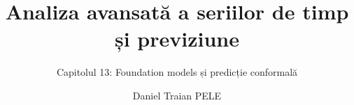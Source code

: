 \title[Analiza avansată a seriilor de timp și previziune]{Analiza avansată a seriilor de timp și previziune}
\subtitle{Capitolul 13: Foundation models și predicție conformală}
\author[D.T. Pele]{Daniel Traian PELE}
\date{}

\providecommand{\atsapplink}[3]{\hypertarget{#2}{}\hyperlink{#1}{\beamergotobutton{#3}}}  %
\providecommand{\atsappback}[2]{\begin{tikzpicture}[remember picture,overlay]\node[anchor=south east] at ([xshift=-3mm,yshift=7mm]current page.south east){\hyperlink{#1}{\beamerreturnbutton{#2}}};\end{tikzpicture}}  %
\providecommand{\atschlink}[2]{\href{#1}{#2}}  %
\providecommand{\atschlinkt}[2]{\href{#1}{\usebeamercolor[fg]{frametitle}#2}}  %


